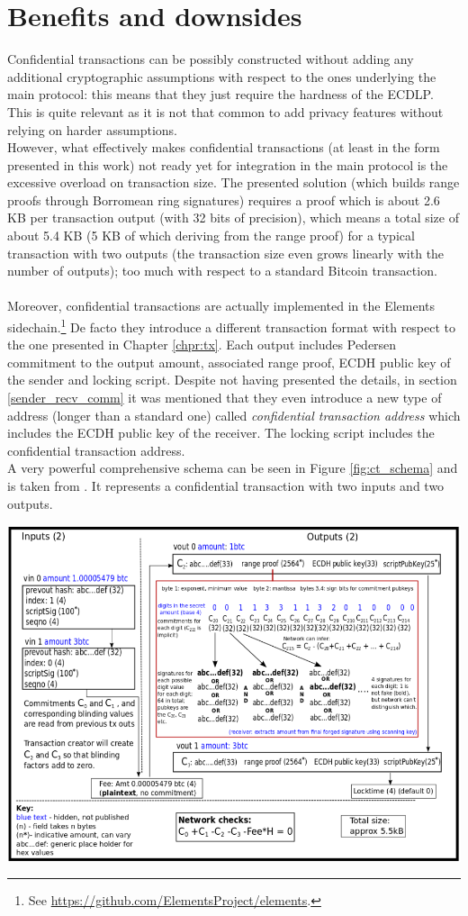 \section{Benefits and downsides}
\label{sec::final_sec}
Confidential transactions can be possibly constructed without adding any additional cryptographic assumptions with respect to the ones underlying the main protocol: this means that they just require the hardness of the ECDLP. This is quite relevant as it is not that common to add privacy features without relying on harder assumptions.\\
However, what effectively makes confidential transactions (at least in the form presented in this work) not ready yet for integration in the main protocol is the excessive overload on transaction size. The presented solution (which builds range proofs through Borromean ring signatures) requires a proof which is about 2.6 KB per transaction output (with 32 bits of precision), which means a total size of about 5.4 KB (5 KB of which deriving from the range proof) for a typical transaction with two outputs (the transaction size even grows linearly with the number of outputs); too much with respect to a standard Bitcoin transaction.
\\ \ \\
Moreover, confidential transactions are actually implemented in the Elements sidechain.\footnote{See \url{https://github.com/ElementsProject/elements}.} De facto they introduce a different transaction format with respect to the one presented in Chapter \ref{chpr:tx}. Each output includes Pedersen commitment to the output amount, associated range proof, ECDH public key of the sender and locking script. Despite not having presented the details, in section \ref{sender_recv_comm} it was mentioned that they even introduce a new type of address (longer than a standard one) called \textit{confidential transaction address} which includes the ECDH public key of the receiver. The locking script includes the confidential transaction address. \\
A very powerful comprehensive schema can be seen in Figure \ref{fig:ct_schema} and is taken from \cite{GibsonCT}. It represents a confidential transaction with two inputs and two outputs.
\begin{center}
\includegraphics[scale = 0.7]{Images/CT_schema.png}%
\label{fig:ct_schema}
\end{center}